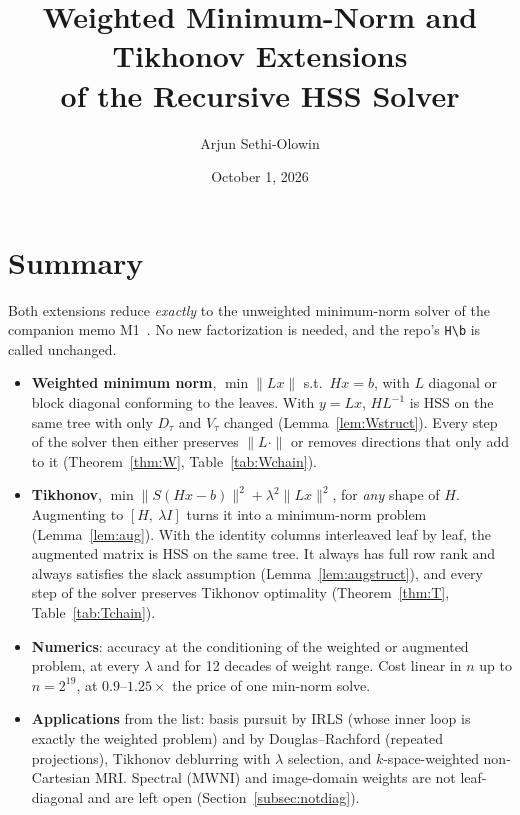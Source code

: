\documentclass[11pt]{article}
\title{Weighted Minimum-Norm and Tikhonov Extensions\\ of the Recursive HSS Solver}
\author{Arjun Sethi-Olowin}
\date{October 1, 2026}
\theoremstyle{remark}
\begin{document}
\maketitle

\section{Summary}
Both extensions reduce \emph{exactly} to the unweighted minimum-norm solver of the companion memo
M1~\cite{memo1}. No new factorization is needed, and the repo's \texttt{H\textbackslash b} is called unchanged.
\begin{itemize}[leftmargin=1.4em,itemsep=1pt]
\item \textbf{Weighted minimum norm}, $\min\|Lx\|$ s.t.\ $Hx=b$, with $L$ diagonal or block diagonal
conforming to the leaves. With $y=Lx$, $HL^{-1}$ is HSS on the same tree with only $D_\tau$ and $V_\tau$
changed (Lemma~\ref{lem:Wstruct}). Every step of the solver then either preserves $\|L\cdot\|$ or
removes directions that only add to it (Theorem~\ref{thm:W}, Table~\ref{tab:Wchain}).
\item \textbf{Tikhonov}, $\min\|S(Hx-b)\|^2+\lambda^2\|Lx\|^2$, for \emph{any} shape of $H$. Augmenting to
$[H,\ \lambda I]$ turns it into a minimum-norm problem (Lemma~\ref{lem:aug}). With the identity
columns interleaved leaf by leaf, the augmented matrix is HSS on the same tree. It always has full
row rank and always satisfies the slack assumption (Lemma~\ref{lem:augstruct}), and every step of
the solver preserves Tikhonov optimality (Theorem~\ref{thm:T}, Table~\ref{tab:Tchain}).
\item \textbf{Numerics}: accuracy at the conditioning of the weighted or augmented problem, at
every $\lambda$ and for 12 decades of weight range. Cost linear in $n$ up to $n=2^{19}$, at
$0.9$--$1.25\times$ the price of one min-norm solve.
\item \textbf{Applications} from the list: basis pursuit by IRLS (whose inner loop is exactly the
weighted problem) and by Douglas--Rachford (repeated projections), Tikhonov deblurring with
$\lambda$ selection, and $k$-space-weighted non-Cartesian MRI. Spectral (MWNI) and image-domain weights are
not leaf-diagonal and are left open (Section~\ref{subsec:notdiag}).
\end{itemize}


\end{document}

